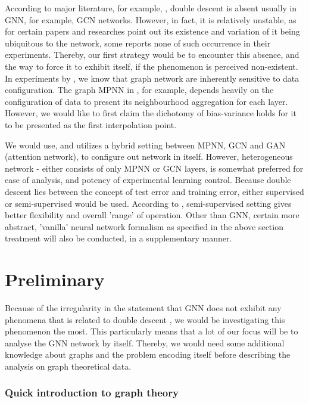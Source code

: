 \documentclass[10pt]{article} %
\begin{document}
According to major literature, for example, \cite{shi2024homophilymodulatesdoubledescent}, double descent is absent usually in GNN, for example, GCN networks. However, in fact, it is relatively unstable, as for certain papers and researches point out its existence and variation of it being ubiquitous to the network, some reports none of such occurrence in their experiments. Thereby, our first strategy would be to encounter this absence, and the way to force it to exhibit itself, if the phenomenon is perceived non-existent. In experiments by \cite{shi2024homophilymodulatesdoubledescent,buschjager_generalized_2020}, we know that graph network are inherently sensitive to data configuration. The graph MPNN in \cite{GRP_Hamilton}, for example, depends heavily on the configuration of data to present its neighbourhood aggregation for each layer. However, we would like to first claim the dichotomy of bias-variance holds for it to be presented as the first interpolation point.

We would use, and utilizes a hybrid setting between MPNN, GCN and GAN (attention network), to configure out network in itself. However, heterogeneous network - either consists of only MPNN or GCN layers, is somewhat preferred for ease of analysis, and potency of experimental learning control. Because double descent lies between the concept of test error and training error, either supervised or semi-supervised would be used. According to \cite{shi2024homophilymodulatesdoubledescent}, semi-supervised setting gives better flexibility and overall 'range' of operation. Other than GNN, certain more abstract, 'vanilla' neural network formalism as specified in the above section treatment will also be conducted, in a supplementary manner. 

\section{Preliminary}

Because of the irregularity in the statement that GNN does not exhibit any phenomena that is related to double descent \cite{shi2024homophilymodulatesdoubledescent}, we would be investigating this phenomenon the most. This particularly means that a lot of our focus will be to analyse the GNN network by itself. Thereby, we would need some additional knowledge about graphs and the problem encoding itself before describing the analysis on graph theoretical data. 

\subsubsection{Quick introduction to graph theory}
\end{document}
